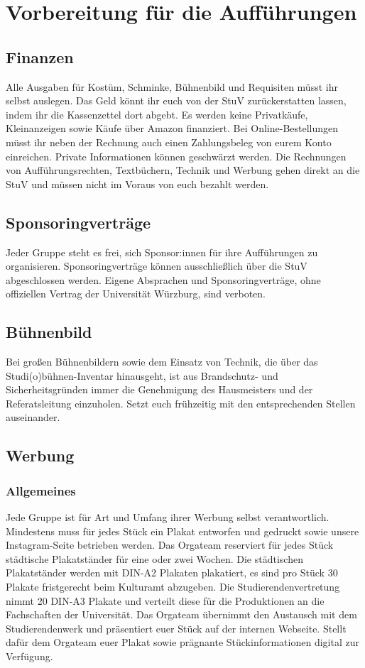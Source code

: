 \section{Vorbereitung für die Aufführungen}
\subsection{Finanzen}
Alle Ausgaben für Kostüm, Schminke, Bühnenbild und Requisiten müsst ihr selbst auslegen. Das Geld könnt ihr euch von der StuV zurückerstatten lassen, indem ihr die Kassenzettel dort abgebt. Es werden keine Privatkäufe, Kleinanzeigen sowie Käufe über Amazon finanziert.
Bei Online-Bestellungen müsst ihr neben der Rechnung auch einen Zahlungsbeleg von eurem Konto einreichen. Private Informationen können geschwärzt werden.
Die Rechnungen von Aufführungsrechten, Textbüchern, Technik und Werbung gehen direkt an die StuV und müssen nicht im Voraus von euch bezahlt werden.	

\subsection{Sponsoringverträge}
Jeder Gruppe steht es frei, sich Sponsor:innen für ihre Aufführungen zu organisieren. Sponsoringverträge können ausschließlich über die StuV abgeschlossen werden. Eigene Absprachen und Sponsoringverträge, ohne offiziellen Vertrag der Universität Würzburg, sind verboten.

\subsection{Bühnenbild}
Bei großen Bühnenbildern sowie dem Einsatz von Technik, die über das Studi(o)bühnen-Inventar hinausgeht, ist aus Brandschutz- und Sicherheitsgründen immer die Genehmigung des Hausmeisters und der Referatsleitung einzuholen. Setzt euch frühzeitig mit den entsprechenden Stellen auseinander.	

\subsection{Werbung}
\subsubsection{Allgemeines}
Jede Gruppe ist für Art und Umfang ihrer Werbung selbst verantwortlich. Mindestens muss für jedes Stück ein Plakat entworfen und gedruckt sowie unsere Instagram-Seite betrieben werden.
Das Orgateam reserviert für jedes Stück städtische Plakatständer für eine oder zwei Wochen. Die städtischen Plakatständer werden mit DIN-A2 Plakaten plakatiert, es sind pro Stück 30 Plakate fristgerecht beim Kulturamt abzugeben. 
Die Studierendenvertretung nimmt 20 DIN-A3 Plakate und verteilt diese für die Produktionen an die Fachschaften der Universität. 
Das Orgateam übernimmt den Austausch mit dem Studierendenwerk und präsentiert euer Stück auf der internen Webseite. Stellt dafür dem Orgateam euer Plakat sowie prägnante Stückinformationen digital zur Verfügung. \\

